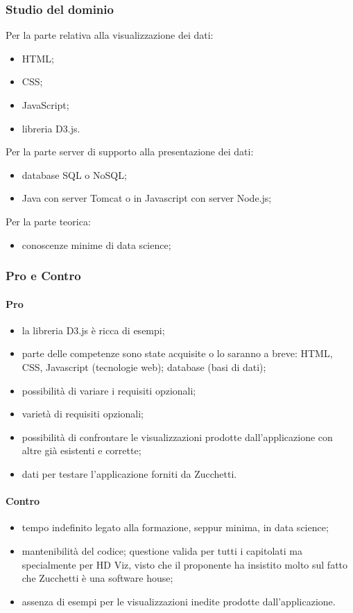 \subsubsection{Studio del dominio}
Per la parte relativa alla visualizzazione dei dati:
\begin{itemize}
	\item HTML;
	\item CSS;
	\item JavaScript;
	\item libreria D3.js.
\end{itemize}
Per la parte server di supporto alla presentazione dei dati:
\begin{itemize}
	\item database SQL o NoSQL;
	\item Java con server Tomcat o in Javascript con server Node.js;
\end{itemize}
Per la parte teorica:
\begin{itemize}
	\item conoscenze minime di data science;
\end{itemize}
\subsubsection{Pro e Contro}
\paragraph*{Pro}
\begin{itemize}
\item la libreria D3.js è ricca di esempi;
\item parte delle competenze sono state acquisite o lo saranno a breve: HTML, CSS, Javascript (tecnologie web); database (basi di dati);
\item possibilità di variare i requisiti opzionali;
\item varietà di requisiti opzionali;
\item possibilità di confrontare le visualizzazioni prodotte dall'applicazione con altre già esistenti e corrette;
\item dati per testare l'applicazione forniti da Zucchetti.
\end{itemize}
\paragraph*{Contro}
\begin{itemize}
	\item tempo indefinito legato alla formazione, seppur minima, in data science;
	\item mantenibilità del codice; questione valida per tutti i capitolati ma specialmente per HD Viz, visto che il proponente ha insistito molto sul fatto che Zucchetti è una software house;
	\item assenza di esempi per le visualizzazioni inedite prodotte dall'applicazione. 
\end{itemize}

